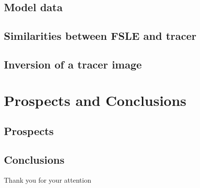 \documentclass[compress,slidescentered,notes=show]{beamer}
\begin{document}
	\subsection{Model data}
\begin{frame}
\end{frame}

	\subsection{Similarities between FSLE and tracer}
\begin{frame}
\end{frame}

	\subsection{Inversion of a tracer image}
\begin{frame}
\end{frame}

\section[Conclusion]{Prospects and Conclusions}

	\subsection{Prospects}
\begin{frame}
\end{frame}

	\subsection{Conclusions}
\begin{frame}
\end{frame}

\begin{frame}
\begin{center}
Thank you for your attention 
\end{center}
\end{frame}
\end{document}
